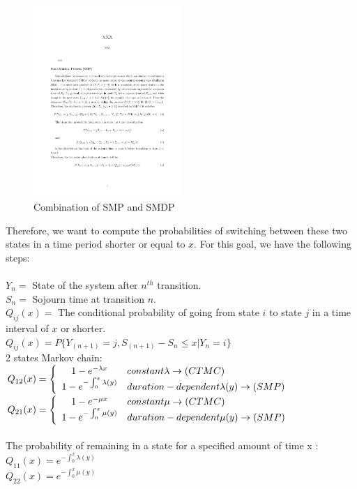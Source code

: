 \documentclass[12pt,letterpaper]{article}
\begin{document}
\begin{figure}[h!]
  \centering
    
      \includegraphics[width=0.5\textwidth]{SMP}
  \caption{Combination of SMP and SMDP}
\end{figure}

Therefore, we want to compute the probabilities of switching between these two states in a time period shorter or equal to $x $. For this goal, we have the following steps:\\
\\
$Y_n=$ State of the system after $n^{th}$ transition.\\
$S_n=$ Sojourn time at transition $n$.\\
$Q_{ij} (x)=$ The conditional probability of going from state $i$ to state $j$ in a time interval of $x$ or shorter.\\
$Q_{ij} (x)=P\{Y_{(n+1)}=j,S_{(n+1)}-S_n\le x|Y_n=i\}$\\
2 states Markov chain:\\

$Q_{12} (x)=\left\{
\begin{array}{c l}      
    1-e^{-\lambda x} &  constant \lambda\rightarrow (CTMC)\\
    1-e^{-\int_{0}^{x} \lambda (y)} & duration-dependent   \lambda(y)\rightarrow     (SMP)
\end{array}\right.$\\


$Q_{21} (x)=\left\{
\begin{array}{c l}      
    1-e^{-\mu x} &  constant \mu\rightarrow (CTMC)\\
    1-e^{-\int_{0}^{x} \mu (y)} & duration-dependent   \mu(y)\rightarrow     (SMP)
\end{array}\right.$\\
\\
The probability of remaining in a state for a specified amount of time x :\\
$Q_{11} (x)=e^{-\int_{0}^{x} \lambda (y)}$\\
$Q_{22} (x)=e^{-\int_{0}^{x} \mu (y)}$
\end{document}
